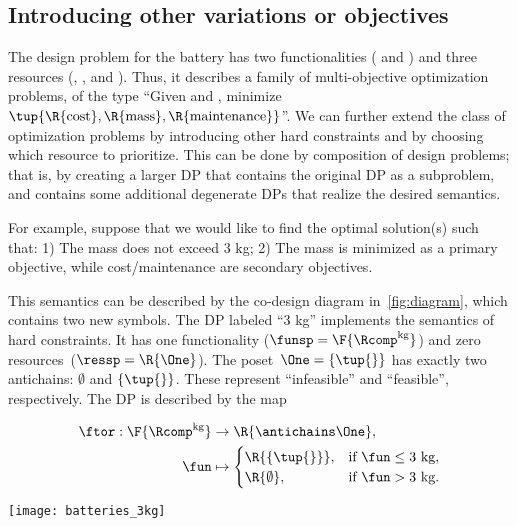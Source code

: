 \subsection{Introducing other variations or objectives}

The design problem for the battery has two functionalities (
and ) and three resources (, ,
and ). Thus, it describes a family of multi-objective
optimization problems, of the type ``Given  and ,
minimize $\tup{ \R{\text{cost}},\R{\text{mass}},\R{\text{maintenance}}} $''.
We can further extend the class of optimization problems by introducing
other hard constraints and by choosing which resource to prioritize.
This can be done by composition of design problems; that is, by creating
a larger DP that contains the original DP as a subproblem, and contains
some additional degenerate DPs that realize the desired semantics.

For example, suppose that we would like to find the optimal solution(s)
such that: 1) The mass does not exceed 3 kg; 2) The mass is minimized
as a primary objective, while cost/maintenance are secondary objectives.

This semantics can be described by the co-design diagram in~\cref{fig:diagram},
which contains two new symbols. The DP labeled ``3 kg'' implements
the semantics of hard constraints. It has one functionality ($\funsp=\F{\Rcomp^{\text{kg}}}$)
and zero resources~($\ressp=\R{\One}$). The poset~$\One=\{\tup{ } \}$
has exactly two antichains: $\emptyset$ and $\{\tup{ } \}$.
These represent ``infeasible'' and ``feasible'', respectively.
The DP is described by the map

\quad\quad
\begin{minipage}[c]{5cm}
    \begin{align*}
        \ftor:\F{\Rcomp^{\text{kg}}} & \rightarrow\R{\antichains\One},\\
        \fun& \mapsto\begin{cases}
                         \R{\{\tup{ } \}}, & \text{if }\fun\leq\text{3 kg},\\
                         \R{\emptyset}, & \text{if }\fun>\text{3 kg}.
        \end{cases}
    \end{align*}

\end{minipage}\quad\texttt{[image: batteries\_3kg]}

\smallskip{}


